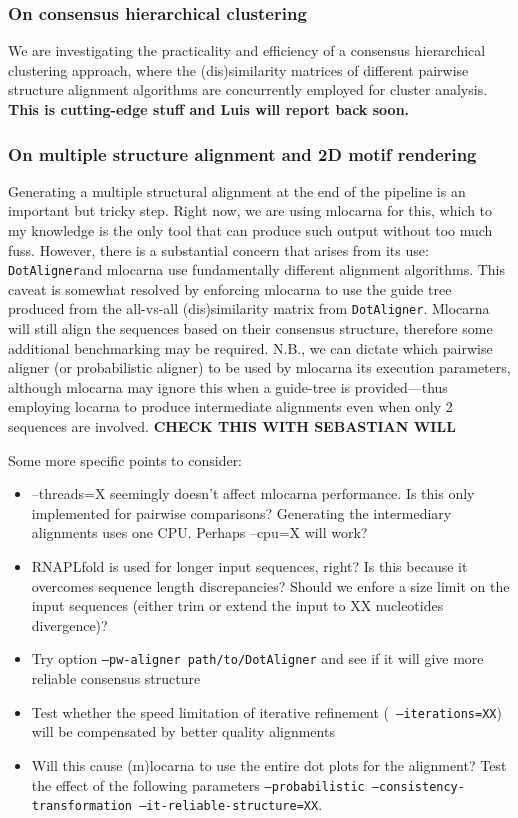 \documentclass[a4paper,twoside]{article}
\newcommand\dotaligner{\texttt{DotAligner}}
\begin{document}
\subsubsection{ On consensus hierarchical clustering }

We are investigating the practicality and efficiency of a consensus
hierarchical clustering approach, where the (dis)similarity matrices of
different pairwise structure alignment algorithms are concurrently employed for
cluster analysis. \textbf{This is cutting-edge stuff and Luis will report back
soon. }


\subsubsection{ On multiple structure alignment and 2D motif rendering }

Generating a multiple structural alignment at the end of the pipeline is an
important but tricky step.  Right now, we are using mlocarna for this, which to
my knowledge is the only tool that can produce such output without too much
fuss. However, there is a substantial concern that arises from its use:
\dotaligner and mlocarna use fundamentally different alignment algorithms. This
caveat is somewhat resolved by enforcing mlocarna to use the guide tree
produced from the all-vs-all (dis)similarity matrix from \dotaligner . Mlocarna
will still align the sequences based on their consensus structure, therefore
some additional benchmarking may be required. N.B., we can dictate which
pairwise aligner (or probabilistic aligner) to be used by mlocarna its
execution parameters, although mlocarna may ignore this when a guide-tree is
provided---thus employing locarna to produce intermediate alignments even when
only 2 sequences are involved. \textbf{CHECK THIS WITH SEBASTIAN WILL }

Some more specific points to consider: 
\begin{itemize}
\item --threads=X seemingly doesn't affect mlocarna performance. Is this only implemented for pairwise comparisons? 
Generating the intermediary alignments uses one CPU. Perhaps --cpu=X will work? 
\item RNAPLfold is used for longer input sequences, right? Is this because it overcomes sequence length discrepancies? 
Should we enfore a size limit on the input sequences (either trim or extend the input to XX nucleotides divergence)?
\item Try option \texttt{--pw-aligner path/to/DotAligner} and see if it will give more reliable consensus structure
\item Test whether the speed limitation of iterative refinement (\texttt{ --iterations=XX}) will be compensated by 
better quality alignments
\item Will this cause (m)locarna to use the entire dot plots for the alignment? Test the effect of the following 
parameters \texttt{--probabilistic --consistency-transformation --it-reliable-structure=XX}. 
\end{itemize} 
\end{document}
